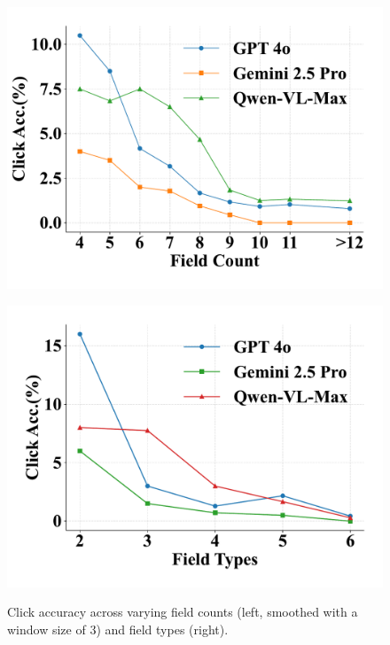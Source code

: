 \documentclass[sigconf, screen, review]{acmart}
\begin{document}
\begin{figure}[htbp]
    \centering
    \begin{minipage}{0.49\linewidth}
        \centering
        \includegraphics[width=\linewidth]{figs/6.pdf}
        \label{fig:ruler1}
    \end{minipage}
    \begin{minipage}{0.49\linewidth}
        \centering
        \includegraphics[width=\linewidth]{figs/5.pdf}
        \label{fig:ruler2}
    \end{minipage}
    \vspace{-20pt}
    \caption{Click accuracy across varying field counts (left, smoothed with a window size of 3) and field types (right).}
    \label{fig:click_trend}
\end{figure}
\end{document}
